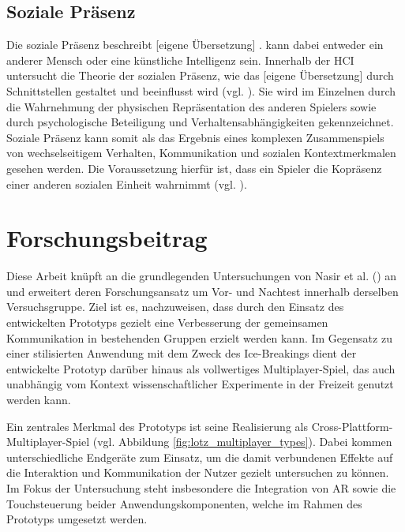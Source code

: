 \subsection{Soziale Präsenz}
Die soziale Präsenz beschreibt  [eigene Übersetzung] \cite[S. 1]{biocca_towards_2003}.  kann dabei entweder ein anderer Mensch oder eine künstliche Intelligenz sein. Innerhalb der \ac{HCI} untersucht die Theorie der sozialen Präsenz, wie das  [eigene Übersetzung] \cite[S. 1]{biocca_towards_2003} durch Schnittstellen gestaltet und beeinflusst wird (vgl. \citealp[S. 1]{biocca_towards_2003}). Sie wird im Einzelnen durch die Wahrnehmung der physischen Repräsentation des anderen Spielers sowie durch psychologische Beteiligung und Verhaltensabhängigkeiten gekennzeichnet. Soziale Präsenz kann somit als das Ergebnis eines komplexen Zusammenspiels von wechselseitigem Verhalten, Kommunikation und sozialen Kontextmerkmalen gesehen werden. Die Voraussetzung hierfür ist, dass ein Spieler die Kopräsenz einer anderen sozialen Einheit wahrnimmt (vgl. \citealp[S. 1]{emmerich_game_2016}).


\section{Forschungsbeitrag}

Diese Arbeit knüpft an die grundlegenden Untersuchungen von Nasir et al. (\citeyear{nasir_cooperative_2013,nasir_effect_2015}) an und erweitert deren Forschungsansatz um Vor- und Nachtest innerhalb derselben Versuchsgruppe. Ziel ist es, nachzuweisen, dass durch den Einsatz des entwickelten Prototyps gezielt eine Verbesserung der gemeinsamen Kommunikation in bestehenden Gruppen erzielt werden kann. Im Gegensatz zu einer stilisierten Anwendung mit dem Zweck des Ice-Breakings dient der entwickelte Prototyp darüber hinaus als vollwertiges Multiplayer-Spiel, das auch unabhängig vom Kontext wissenschaftlicher Experimente in der Freizeit genutzt werden kann.

Ein zentrales Merkmal des Prototyps ist seine Realisierung als Cross-Plattform-Multiplayer-Spiel (vgl. Abbildung \ref{fig:lotz_multiplayer_types}). Dabei kommen unterschiedliche Endgeräte zum Einsatz, um die damit verbundenen Effekte auf die Interaktion und Kommunikation der Nutzer gezielt untersuchen zu können. Im Fokus der Untersuchung steht insbesondere die Integration von \ac{AR} sowie die Touchsteuerung beider Anwendungskomponenten, welche im Rahmen des Prototyps umgesetzt werden.

